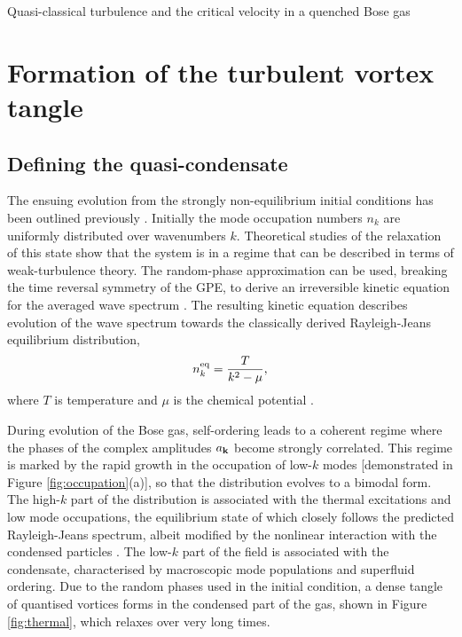 \begin{chapter}{\label{cha:nonequib}Quasi-classical turbulence and the critical velocity in a quenched Bose gas}
\section{Formation of the turbulent vortex tangle}
\subsection{Defining the quasi-condensate}
The ensuing evolution from the strongly non-equilibrium initial conditions has been outlined previously \cite{PhysRevA.66.013603,pattinson_2014}.  Initially the mode occupation numbers $n_k$ are uniformly distributed over wavenumbers $k$. Theoretical studies of the relaxation of this state show that the system is in a regime that can be described in terms of weak-turbulence theory. The random-phase approximation can be used, breaking the time reversal symmetry of the GPE, to derive an irreversible kinetic equation for the averaged wave spectrum \cite{PhysRevLett.95.263901}. The resulting kinetic equation describes evolution of the wave spectrum towards the classically derived Rayleigh-Jeans equilibrium distribution,
\begin{equation}
n^{\rm eq}_k = \frac{T}{k^2-\mu},
\end{equation}
where $T$ is temperature and $\mu$ is the chemical potential \cite{Newell01}.

During evolution of the Bose gas, self-ordering leads to a coherent regime where the phases of the complex amplitudes $a_{\bf k}$ become strongly correlated. This regime is marked by the rapid growth in the occupation of low-$k$ modes [demonstrated in Figure \ref{fig:occupation}(a)], so that the distribution evolves to a bimodal form. The high-$k$ part of the distribution is associated with the thermal excitations and low mode occupations, the equilibrium state of which closely follows the predicted Rayleigh-Jeans spectrum, albeit modified by the nonlinear interaction with the condensed particles \cite{PhysRevLett.95.263901}. The low-$k$ part of the field is associated with the condensate, characterised by macroscopic mode populations and superfluid ordering. Due to the random phases used in the initial condition, a dense tangle of quantised vortices forms in the condensed part of the gas, shown in Figure \ref{fig:thermal}, which relaxes over very long times.


\end{chapter}
